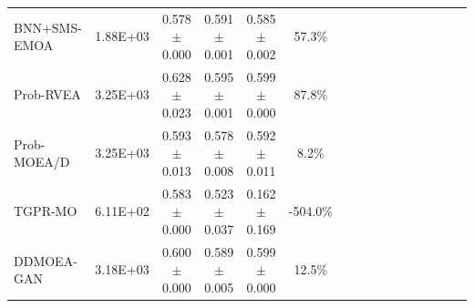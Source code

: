 \begin{table}[htbp]
{\begin{tabular}{l c c c c c c c c c c c c c c c}
BNN+SMS-EMOA & 1.88E+03 & 0.578$\pm$0.000 & 0.591$\pm$0.001 & 0.585$\pm$0.002 & 57.3\% &  &  &  &  &  &  &  &  &  &  \\
Prob-RVEA & 3.25E+03 & 0.628$\pm$0.023 & 0.595$\pm$0.001 & 0.599$\pm$0.000 & 87.8\% &  &  &  &  &  &  &  &  &  &  \\
Prob-MOEA/D & 3.25E+03 & 0.593$\pm$0.013 & 0.578$\pm$0.008 & 0.592$\pm$0.011 & 8.2\% &  &  &  &  &  &  &  &  &  &  \\
TGPR-MO & 6.11E+02 & 0.583$\pm$0.000 & 0.523$\pm$0.037 & 0.162$\pm$0.169 & -504.0\% &  &  &  &  &  &  &  &  &  &  \\
DDMOEA-GAN & 3.18E+03 & 0.600$\pm$0.000 & 0.589$\pm$0.005 & 0.599$\pm$0.000 & 12.5\% &  &  &  &  &  &  &  &  &  &  \\
\hline
\end{tabular}
}
\end{table}
